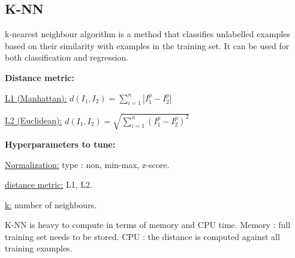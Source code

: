 \subsection*{K-NN}
k-nearest neighbour algorithm is a
method that classifies unlabelled examples based on
their similarity with examples in the training set.
It can be used for both classification and regression.

\textbf{Distance metric:}

\underline{L1 (Manhattan):} $d(I_1, I_2) = \sum_{i=1}^{n} |I_1^p - I_2^p|$

\underline{L2 (Euclidean):} $d(I_1, I_2) = \sqrt{\sum_{i=1}^{n} (I_1^p - I_2^p)^2}$

\textbf{Hyperparameters to tune:}

\underline{Normalization:} type : non, min-max, z-score.

\underline{distance metric:} L1, L2.

\underline{k:} number of neighbours.

K-NN is heavy to compute in terms of memory and CPU time. Memory : full training set needs to be stored.
CPU : the distance is computed against all training examples.
